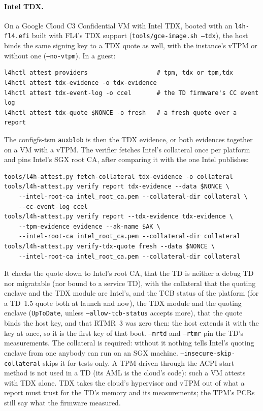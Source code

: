 \documentclass[11pt,a4paper]{report}
\newcommand{\cmd}[1]{\texttt{#1}}
\newcommand{\file}[1]{\texttt{#1}}
\begin{document}
\paragraph{Intel TDX.} On a Google Cloud C3 Confidential VM with Intel TDX,
booted with an \file{l4h-fl4.efi} built with FL4's TDX support
(\cmd{tools/gce-image.sh --tdx}), the host binds the same signing key to a
TDX quote as well, with the instance's vTPM or without one
(\texttt{--no-vtpm}). In a guest:
\begin{verbatim}
l4hctl attest providers                   # tpm, tdx or tpm,tdx
l4hctl attest tdx-evidence -o tdx-evidence
l4hctl attest tdx-event-log -o ccel       # the TD firmware's CC event log
l4hctl attest tdx-quote $NONCE -o fresh   # a fresh quote over a report
\end{verbatim}
The configfs-tsm \texttt{auxblob} is then the TDX evidence, or both
evidences together on a VM with a vTPM. The verifier fetches Intel's
collateral once per platform and pins Intel's SGX root CA, after comparing
it with the one Intel publishes:
\begin{verbatim}
tools/l4h-attest.py fetch-collateral tdx-evidence -o collateral
tools/l4h-attest.py verify report tdx-evidence --data $NONCE \
    --intel-root-ca intel_root_ca.pem --collateral-dir collateral \
    --cc-event-log ccel
tools/l4h-attest.py verify report --tdx-evidence tdx-evidence \
    --tpm-evidence evidence --ak-name $AK \
    --intel-root-ca intel_root_ca.pem --collateral-dir collateral
tools/l4h-attest.py verify-tdx-quote fresh --data $NONCE \
    --intel-root-ca intel_root_ca.pem --collateral-dir collateral
\end{verbatim}
It checks the quote down to Intel's root CA, that the TD is neither a
debug TD nor migratable (nor bound to a service TD),
with the collateral that the quoting enclave and the TDX module are
Intel's, and the TCB status of the platform (for a TD~1.5 quote both at
launch and now), the TDX module and the quoting enclave
(\texttt{UpToDate}, unless \texttt{--allow-tcb-status} accepts more), that
the quote binds the host key, and that RTMR~3 was zero then: the host
extends it with the key at once, so it is the first key of that boot.
\texttt{--mrtd} and \texttt{--rtmr} pin the TD's measurements. The
collateral is required: without it nothing tells Intel's quoting enclave
from one anybody can run on an SGX machine. \texttt{--insecure-skip-collateral}
skips it for tests only. A TPM driven through the ACPI start method is not
used in a TD (its AML is the cloud's code): such a VM attests with TDX
alone. TDX takes
the cloud's hypervisor and vTPM out of what a report must trust for the
TD's memory and its measurements; the TPM's PCRs still say what the
firmware measured.
\end{document}
